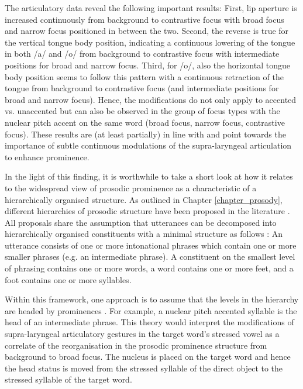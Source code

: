 The articulatory data reveal the following important results: First, lip aperture is increased continuously from background to contrastive focus with broad focus and narrow focus positioned in between the two. Second, the reverse is true for the vertical tongue body position, indicating a continuous lowering of the tongue in both /a/ and /o/ from background to contrastive focus with intermediate positions for broad and narrow focus. Third, for /o/, also the horizontal tongue body position seems to follow this pattern with a continuous retraction of the tongue from background to contrastive focus (and intermediate positions for broad and narrow focus). Hence, the modifications do not only apply to accented vs. unaccented but can also be observed in the group of focus types with the nuclear pitch accent on the same word (broad focus, narrow focus, contrastive focus). These results are (at least partially) in line with \citet{MückeGrice2014} and point towards the importance of subtle continuous modulations of the supra-laryngeal articulation to enhance prominence.

In the light of this finding, it is worthwhile to take a short look at how it relates to the widespread view of prosodic prominence as a characteristic of a hierarchically organised structure. As outlined in Chapter \ref{chapter_prosody}, different hierarchies of prosodic structure have been proposed in the literature \citep{NesporVogel1986, PierrehumbertBeckman1988, Hayes1989, Selkirk1996, ShattuckHufnagelTurk1996}. All proposals share the assumption that utterances can be decomposed into hierarchically organised constituents with a minimal structure as follows \citep{Grice2006}: An utterance consists of one or more intonational phrases which contain one or more smaller phrases (e.g. an intermediate phrase). A constituent on the smallest level of phrasing contains one or more words, a word contains one or more feet, and a foot contains one or more syllables. 

Within this framework, one approach is to assume that the levels in the hierarchy are headed by prominences \citep{BeckmanEdwards1994, ShattuckHufnagelTurk1996}. For example, a nuclear pitch accented syllable is the head of an intermediate phrase. This theory would interpret the modifications of supra-laryngeal articulatory gestures in the target word’s stressed vowel as a correlate of the reorganisation in the prosodic prominence structure from background to broad focus. The nucleus is placed on the target word and hence the head status is moved from the stressed syllable of the direct object to the stressed syllable of the target word. 

